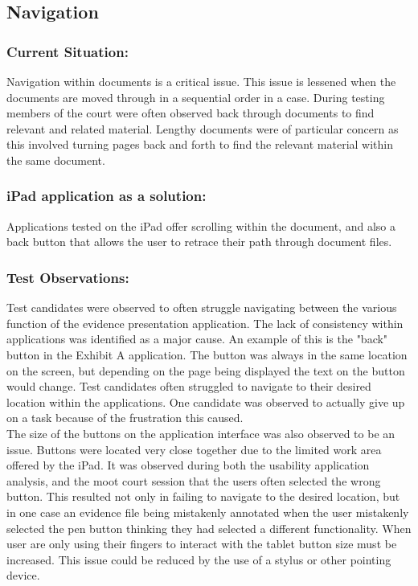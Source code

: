 \subsection{Navigation}
\subsubsection{Current Situation:}
Navigation within documents is a critical issue. This issue is lessened when the documents are moved through in a sequential order in a case. During testing members of the court were often observed back through documents to find relevant and related material. Lengthy documents were of particular concern as this involved turning pages back and forth to find the relevant material within the same document.\\
\subsubsection{iPad application as a solution:}
Applications tested on the iPad offer scrolling within the document, and also a back button that allows the user to retrace their path through document files.\\
\subsubsection{Test Observations:}
Test candidates were observed to often struggle navigating between the various function of the evidence presentation application. The lack of consistency within applications was identified as a major cause. An example of this is the "back" button in the Exhibit A application. The button was always in the same location on the screen, but depending on the page being displayed the text on the button would change. Test candidates often struggled to navigate to their desired location within the applications. One candidate was observed to actually give up on a task because of the frustration this caused. \\
The size of the buttons on the application interface was also observed to be an issue. Buttons were located very close together due to the limited work area offered by the iPad. It was observed during both the usability application analysis, and the moot court session that the users often selected the wrong button. This resulted not only in failing to navigate to the desired location, but in one case an evidence file being mistakenly annotated when the user mistakenly selected the pen button thinking they had selected a different functionality. When user are only using their fingers to interact with the tablet button size must be increased. This issue could be reduced by the use of a stylus or other pointing device.
